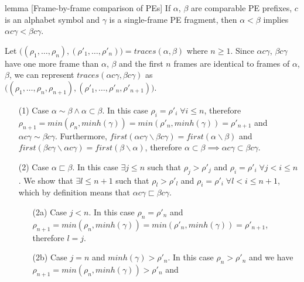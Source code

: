 \documentclass[AMA,STIX1COL]{WileyNJD-v2}
\begin{document}
\begin{theoremEnd}[restate, no link to proof, no link to theorem, category=lemma_frames]{lemma}
[Frame-by-frame comparison of PEs]
    \label{lemma_incr_cmp_frames}
    If $\alpha$, $\beta$ are comparable PE prefixes,
    $c$ is an alphabet symbol and
    $\gamma$ is a single-frame PE fragment,
    then $\alpha < \beta$ implies $\alpha c \gamma < \beta c \gamma$.
\end{theoremEnd}
\begin{proofEnd}
    Let $\big((\rho_1, \dots, \rho_n), (\rho'_1, \dots, \rho'_n)\big) = traces(\alpha, \beta)$ where $n \geq 1$.
    Since $\alpha c \gamma$, $\beta c \gamma$ have one more frame than $\alpha$, $\beta$
    and the first $n$ frames are identical to frames of $\alpha$, $\beta$,
    we can represent $traces(\alpha c \gamma, \beta c \gamma)$
    as $\big((\rho_1, \dots, \rho_n, \rho_{n+1}), (\rho'_1, \dots, \rho'_n, \rho'_{n+1})\big)$.
    \begin{itemize}[itemsep=0.5em, topsep=0.5em]
    \item[(1)]
        Case $\alpha \sim \beta \wedge \alpha \subset \beta$.
        In this case $\rho_i = \rho'_i \;\forall i \leq n$,
        therefore $\rho_{n+1} = min(\rho_n, minh(\gamma)) = min(\rho'_n, minh(\gamma)) = \rho'_{n+1}$
        and $\alpha c \gamma \sim \beta c \gamma$.
        Furthermore,
        $first (\alpha c \gamma \backslash \beta c \gamma) = first (\alpha \backslash \beta)$ and
        $first (\beta c \gamma \backslash \alpha c \gamma) = first (\beta \backslash \alpha)$,
        therefore $\alpha \subset \beta \implies \alpha c \gamma \subset \beta c \gamma$.
    \item[(2)]
        Case $\alpha \sqsubset \beta$.
        In this case $\exists j \leq n$ such that $\rho_j > \rho'_j$ and $\rho_i = \rho'_i \;\forall j < i \leq n$.
        We show that $\exists l \leq n + 1$ such that $\rho_l > \rho'_l$ and $\rho_i = \rho'_i \;\forall l < i \leq n + 1$,
        which by definition means that $\alpha c \gamma \sqsubset \beta c \gamma$.
        \begin{itemize}
        \item[(2a)]
            Case $j < n$.
            In this case $\rho_n = \rho'_n$ and
            $\rho_{n+1} = min(\rho_n, minh(\gamma)) = min(\rho'_n, minh(\gamma)) = \rho'_{n+1}$,
            therefore $l = j$.
        \item[(2b)]
            Case $j = n$ and $minh(\gamma) > \rho'_n$.
            In this case $\rho_n > \rho'_n$ and we have
            $\rho_{n+1} = min(\rho_n, minh(\gamma)) > \rho'_n$ and

\end{itemize}
\end{itemize}
\end{proofEnd}
\end{document}
